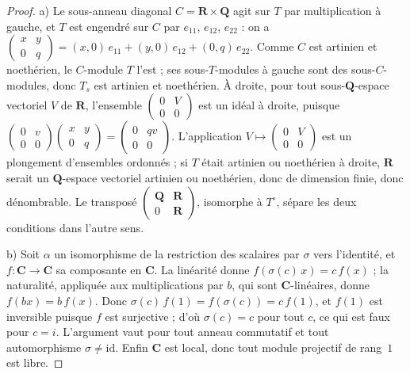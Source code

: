 \begin{proof}
a) Le sous-anneau diagonal $C = \mathbf R \times \mathbf Q$ agit sur $T$ par multiplication à gauche, et $T$ est engendré sur $C$ par $e_{11}$, $e_{12}$, $e_{22}$ : on a $\left(\begin{smallmatrix} x & y \\ 0 & q \end{smallmatrix}\right) = (x, 0)\,e_{11} + (y, 0)\,e_{12} + (0, q)\,e_{22}$. Comme $C$ est artinien et noethérien, le $C$-module $T$ l'est ; ses sous-$T$-modules à gauche sont des sous-$C$-modules, donc $T_s$ est artinien et noethérien. À droite, pour tout sous-$\mathbf Q$-espace vectoriel $V$ de $\mathbf R$, l'ensemble $\left(\begin{smallmatrix} 0 & V \\ 0 & 0 \end{smallmatrix}\right)$ est un idéal à droite, puisque $\left(\begin{smallmatrix} 0 & v \\ 0 & 0 \end{smallmatrix}\right)\left(\begin{smallmatrix} x & y \\ 0 & q \end{smallmatrix}\right) = \left(\begin{smallmatrix} 0 & qv \\ 0 & 0 \end{smallmatrix}\right)$. L'application $V \mapsto \left(\begin{smallmatrix} 0 & V \\ 0 & 0 \end{smallmatrix}\right)$ est un plongement d'ensembles ordonnés ; si $T$ était artinien ou noethérien à droite, $\mathbf R$ serait un $\mathbf Q$-espace vectoriel artinien ou noethérien, donc de dimension finie, donc dénombrable. Le transposé $\left(\begin{smallmatrix} \mathbf Q & \mathbf R \\ 0 & \mathbf R \end{smallmatrix}\right)$, isomorphe à $T^{\circ}$, sépare les deux conditions dans l'autre sens.

b) Soit $\alpha$ un isomorphisme de la restriction des scalaires par $\sigma$ vers l'identité, et $f : \mathbf C \to \mathbf C$ sa composante en $\mathbf C$. La linéarité donne $f(\sigma(c)\,x) = c\,f(x)$ ; la naturalité, appliquée aux multiplications par $b$, qui sont $\mathbf C$-linéaires, donne $f(bx) = b\,f(x)$. Donc $\sigma(c)\,f(1) = f(\sigma(c)) = c\,f(1)$, et $f(1)$ est inversible puisque $f$ est surjective ; d'où $\sigma(c) = c$ pour tout $c$, ce qui est faux pour $c = i$. L'argument vaut pour tout anneau commutatif et tout automorphisme $\sigma \neq \mathrm{id}$. Enfin $\mathbf C$ est local, donc tout module projectif de rang~$1$ est libre.


\end{proof}
